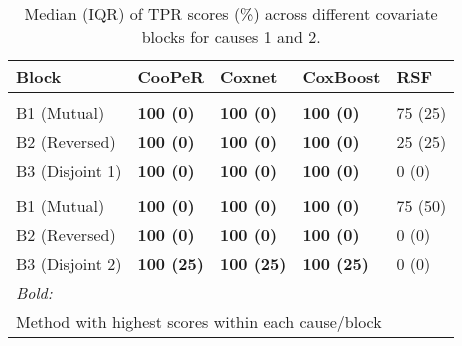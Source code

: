 \begin{table}
\centering
\caption{Median (IQR) of TPR scores (\%) across different covariate blocks for causes 1 and 2.\label{tab:tpr-median}}
\centering
\begin{tabular}[t]{lllll}
\toprule
Block & CooPeR & Coxnet & CoxBoost & RSF\\
\midrule
\addlinespace[0.3em]
\multicolumn{5}{l}{\textbf{Cause 1}}\\
\hspace{1em}B1 (Mutual) & \textbf{100 (0)} & \textbf{100 (0)} & \textbf{100 (0)} & 75 (25)\\
\hspace{1em}B2 (Reversed) & \textbf{100 (0)} & \textbf{100 (0)} & \textbf{100 (0)} & 25 (25)\\
\hspace{1em}B3 (Disjoint 1) & \textbf{100 (0)} & \textbf{100 (0)} & \textbf{100 (0)} & 0 (0)\\
\addlinespace[0.3em]
\multicolumn{5}{l}{\textbf{Cause 2}}\\
\hspace{1em}B1 (Mutual) & \textbf{100 (0)} & \textbf{100 (0)} & \textbf{100 (0)} & 75 (50)\\
\hspace{1em}B2 (Reversed) & \textbf{100 (0)} & \textbf{100 (0)} & \textbf{100 (0)} & 0 (0)\\
\hspace{1em}B3 (Disjoint 2) & \textbf{100 (25)} & \textbf{100 (25)} & \textbf{100 (25)} & 0 (0)\\
\bottomrule
\multicolumn{5}{l}{\rule{0pt}{1em}\textit{Bold:}}\\
\multicolumn{5}{l}{\rule{0pt}{1em}Method with highest scores within each cause/block}\\
\end{tabular}
\end{table}
